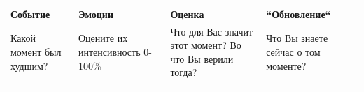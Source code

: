 \documentclass{worksheet_landscape}
\begin{document}
\begin{table}[]
\begin{center}
\renewcommand{\arraystretch}{1.4}

\begin{tabularx}{\textwidth}{|Y|Y|Y|Y|}

\hline
\textbf{Событие} & \textbf{Эмоции} & \textbf{Оценка} & \textbf{``Обновление``} \\
\small{Какой момент был худшим?} & \small{Оцените их интенсивность 0-100\%} & \small{Что для Вас значит этот момент? Во что Вы верили тогда?} & \small{Что Вы знаете сейчас о том моменте?} \\
\hline
& & & \\[425pt]
\hline
\end{tabularx}
\end{center}
\label{tab:activity_diary}
\end{table}
\end{document}

